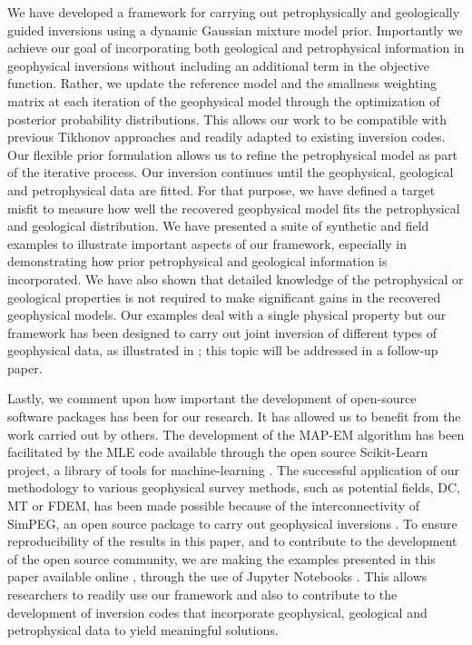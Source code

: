 \documentclass[extra]{gji} %
\begin{document}
We have developed a framework for carrying out petrophysically and geologically guided inversions using a dynamic Gaussian mixture model prior. Importantly we achieve our goal of incorporating both geological and petrophysical information in geophysical inversions without including an additional term in the objective function. Rather, we update the reference model and the smallness weighting matrix at each iteration of the geophysical model through the optimization of posterior probability distributions. This allows our work to be compatible with previous Tikhonov approaches and readily adapted to existing inversion codes. Our flexible prior formulation allows us to refine the petrophysical model as part of the iterative process. Our inversion continues until the geophysical, geological and petrophysical data are fitted. For that purpose, we have defined a target misfit to measure how well the recovered geophysical model fits the petrophysical and geological distribution. We have presented a suite of synthetic and field examples to illustrate important aspects of our framework, especially in demonstrating how prior petrophysical and geological information is incorporated. We have also shown that detailed knowledge of the petrophysical or geological properties is not required to make significant gains in the recovered geophysical models. Our examples deal with a single physical property but our framework has been designed to carry out joint inversion of different types of geophysical data, as illustrated in \cite{Astic2018b}; this topic will be addressed in a follow-up paper.

Lastly, we comment upon how important the development of open-source software packages has been for our research. It has allowed us to benefit from the work carried out by others. The development of the MAP-EM algorithm has been facilitated by the MLE code available through the open source Scikit-Learn project, a library of tools for machine-learning \citep{scikit-learn}. The successful application of our methodology to various geophysical survey methods, such as potential fields, DC, MT or FDEM, has been made possible because of the interconnectivity of SimPEG, an open source package to carry out geophysical inversions \citep{Cockett2015,heagy2017framework,SimPEGEM1DPoster}. To ensure reproducibility of the results in this paper, and to contribute to the development of the open source community, we are making the examples presented in this paper available online \citep{PGIexamples}, through the use of Jupyter Notebooks \citep{Perez2015}. This allows researchers to readily use our framework and also to contribute to the development of inversion codes that incorporate geophysical,  geological and petrophysical data to yield meaningful solutions.
\end{document}
